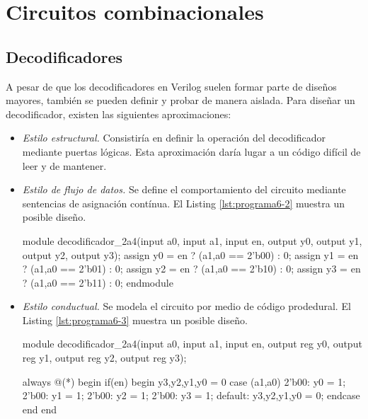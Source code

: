 \section{Circuitos combinacionales}

\subsection{Decodificadores}
A pesar de que los decodificadores en Verilog suelen formar parte de diseños mayores, también se pueden definir y probar de manera aislada. Para diseñar un decodificador, existen las siguientes aproximaciones:

\begin{itemize}
    \item \emph{Estilo estructural.} Consistiría en definir la operación del decodificador mediante puertas lógicas. Esta aproximación daría lugar a un código difícil de leer y de mantener.
    \item \emph{Estilo de flujo de datos.} Se define el comportamiento del circuito mediante sentencias de asignación contínua. El Listing \ref{lst:programa6-2} muestra un posible diseño.

\begin{mycode}[style=verilogstyle, caption={Estilo de flujo de datos.}, label=lst:programa6-2]
module decodificador_2a4(input a0, 
                   input a1, 
                   input en, 
                   output y0, 
                   output y1, 
                   output y2, 
                   output y3);
    assign y0 = en ? ({a1,a0} == 2'b00) : 0;
    assign y1 = en ? ({a1,a0} == 2'b01) : 0;
    assign y2 = en ? ({a1,a0} == 2'b10) : 0;
    assign y3 = en ? ({a1,a0} == 2'b11) : 0;
endmodule
\end{mycode}
    
    \item \emph{Estilo conductual.} Se modela el circuito por medio de código prodedural. El Listing \ref{lst:programa6-3} muestra un posible diseño.

\begin{mycode}[style=verilogstyle, caption={Estilo conductual.}, label=lst:programa6-3]
module decodificador_2a4(input a0, 
                   input a1, 
                   input en, 
                   output reg y0, 
                   output reg y1, 
                   output reg y2, 
                   output reg y3);

    always @(*) begin
        if(en) begin
            {y3,y2,y1,y0} = 0
            case ({a1,a0})
                2'b00: y0 = 1;
                2'b00: y1 = 1;
                2'b00: y2 = 1;
                2'b00: y3 = 1; 
                default: {y3,y2,y1,y0} = 0;
            endcase
        end
    end
    

\end{mycode}
\end{itemize}
